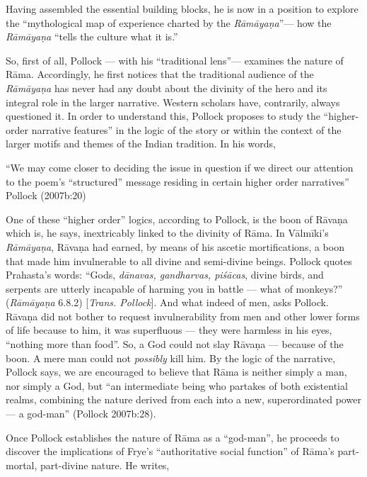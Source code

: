 Having assembled the essential building blocks, he is now in a position to explore the “mythological map of experience charted by the {\sl Rāmāyaṇa}”--- how the {\sl Rāmāyaṇa} “tells the culture what it is.” 

\newpage

So, first of all, Pollock --- with his “traditional lens”--- examines the nature of Rāma. Accordingly, he first notices that the traditional audience of the {\sl Rāmāyaṇa} has never had any doubt about the divinity of the hero and its integral role in the larger narrative. Western scholars have, contrarily, always questioned it. In order to understand this, Pollock proposes to study the “higher-order narrative features” in the logic of the story or within the context of the larger motifs and themes of the Indian tradition. In his words,

\begin{myquote}
“We may come closer to deciding the issue in question if we direct our attention to the poem’s “structured” message residing in certain higher order narratives”
\hfill Pollock (2007b:20)
\end{myquote}

One of these “higher order” logics, according to Pollock, is the boon of Rāvaṇa which is, he says, inextricably linked to the divinity of Rāma. In Vālmīki’s {\sl Rāmāyaṇa}, Rāvaṇa had earned, by means of his ascetic mortifications, a boon that made him invulnerable to all divine and semi-divine beings.  Pollock quotes Prahasta’s words: “Gods, {\sl dānavas, gandharvas, piśācas}, divine birds, and serpents are utterly incapable of harming you in battle --- what of monkeys?” ({\sl Rāmāyaṇa} 6.8.2) [{\sl Trans. Pollock}]. And what indeed of men, asks Pollock. Rāvaṇa did not bother to request invulnerability from men and other lower forms of life because to him, it was superfluous --- they were harmless in his eyes, “nothing more than food”. So, a God could not slay Rāvaṇa --- because of the boon. A mere man could not {\sl possibly} kill him. By the logic of the narrative, Pollock says, we are encouraged to believe that Rāma is neither simply a man, nor simply a God, but “an intermediate being who partakes of both existential realms, combining the nature derived from each into a new, superordinated power --- a god-man” (Pollock 2007b:28).  

Once Pollock establishes the nature of Rāma as a “god-man”, he proceeds to discover the implications of Frye’s “authoritative social function” of Rāma’s part-mortal, part-divine nature. He writes, 

